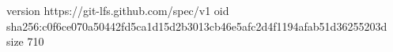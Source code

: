 version https://git-lfs.github.com/spec/v1
oid sha256:c0f6ce070a50442fd5ca1d15d2b3013cb46e5afc2d4f1194afab51d36255203d
size 710
